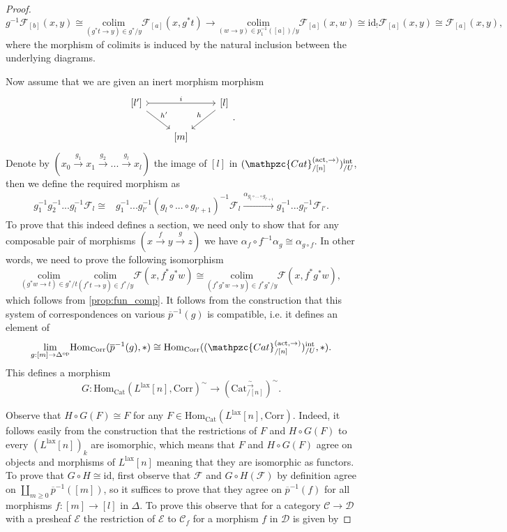 \documentclass[a4paper, reqno]{amsart}
\theoremstyle{definition}
\newcommand\cC{\mathscr C}
\newcommand\cD{\mathscr D}
\newcommand\cE{\mathscr E}
\newcommand\cF{\mathscr F}
\newcommand\id{\mathrm{id}}
\newcommand\mor{\mathrm{Hom}}
\newcommand\op{\mathrm{op}}
\newcommand\cat{\mathrm{Cat}}
\newcommand\ccat{\mathpzc{Cat}}
\newcommand\colim{\mathrm{colim}}
\newcommand\corr{\mathrm{Corr}}
\newcommand\lax{\mathrm{lax}}
\newcommand\wrr{{\overset{\sim}{\rightarrow}}}
\newcommand\act{\mathrm{act}}
\newcommand\inrt{\mathrm{int}}
\begin{document}
\begin{proof}
\[g^{-1}\cF_{[b]}(x,y)\cong\underset{(g^*t\rightarrow y)\in g^*/y}{\colim}\cF_{[a]}(x,g^*t)\rightarrow \underset{(w\rightarrow y)\in p_1^{-1}([a])/y}{\colim}\cF_{[a]}(x,w)\cong\id_!\cF_{[a]}(x,y)\cong\cF_{[a]}(x,y),\]
where the morphism of colimits is induced by the natural inclusion between the underlying diagrams.\par
Now assume that we are given an inert morphism morphism
\[
\begin{tikzcd}
{[l']}\arrow[rr, tail, "i"]\arrow[dr, "h'"]&{}&{[l]}\arrow[dl, "h" swap]\\
{}&{[m]}
\end{tikzcd}.
\]
Denote by $(x_0\xrightarrow{g_1}x_1\xrightarrow{g_2}...\xrightarrow{g_l}x_l)$ the image of $[l]$ in $(\ccat^{(\act,\rightarrow)}_{/[n]})^\inrt_{/U}$, then we define the required morphism as
\begin{align*}
    g_1^{-1}g_2^{-1}...g_l^{-1}\cF_l\cong& g_1^{-1}...g_{l'}^{-1}(g_l\circ...\circ g_{l'+1})^{-1}\cF_l\xrightarrow{\alpha_{g_l\circ...\circ g_{l'+1}}}g_1^{-1}...g_{l'}^{-1}\cF_{l'}.
\end{align*}
To prove that this indeed defines a section, we need only to show that for any composable pair of morphisms $(x\xrightarrow{f}y\xrightarrow{g}z)$ we have $\alpha_f\circ f^{-1}\alpha_g\cong\alpha_{g\circ f}$. In other words, we need to prove the following isomorphism
\[\underset{(g^*w\rightarrow t)\in g^*/t}{\colim}\underset{(f^*t\rightarrow y)\in f^*/y}{\colim}\cF(x,f^*g^*w)\cong\underset{(f^*g^*w\rightarrow y)\in f^*g^*/y}{\colim}\cF(x,f^*g^*w),\]
which follows from \cref{prop:fun_comp}. It follows from the construction that this system of correspondences on various $\overline{p}^{-1}(g)$ is compatible, i.e. it defines an element of 
\[\underset{g:[m]\rightarrow\Delta^\op}{\lim}\mor_\corr(\overline{p}^{-1}(g),*)\cong\mor_\corr((\ccat^{(\act,\rightarrow)}_{/[n]})^\inrt_{/U},*).\]
This defines a morphism \[G:\mor_\cat(L^\lax[n],\corr)^\sim\rightarrow(\cat^\wrr_{/[n]})^\sim.\]\par
Observe that $H\circ G (F)\cong F$ for any $F\in\mor_\cat(L^\lax[n],\corr)$. Indeed, it follows easily from the construction that the restrictions of $F$ and $H\circ G(F)$ to every $(L^\lax[n])_k$ are isomorphic, which means that $F$ and $H\circ G (F)$ agree on objects and morphisms of $L^\lax[n]$ meaning that they are isomorphic as functors. To prove that $G\circ H\cong\id$, first observe that $\cF$ and $G\circ H(\cF)$ by definition agree on $\coprod_{m\geq0}\overline{p}^{-1}([m])$, so it suffices to prove that they agree on $\overline{p}^{-1}(f)$ for all morphisms $f:[m]\rightarrow[l]$ in $\Delta$. To prove this observe that for a category $\cC\rightarrow\cD$ with a presheaf $\cE$ the restriction of $\cE$ to $\cC_f$ for a morphism $f$ in $\cD$ is given by 

\end{proof}
\end{document}
